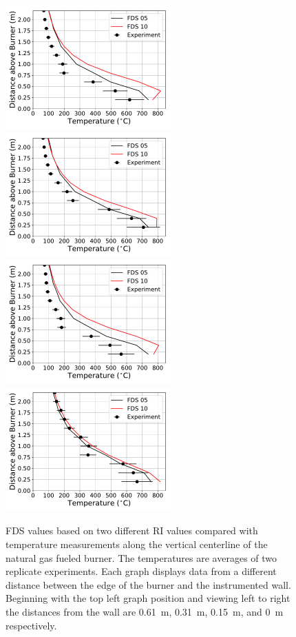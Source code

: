 \documentclass[twoside]{uocthesis}
\begin{document}
{\begin{figure}[ht!]
  \centering
  \includegraphics[width=2.5in]{../Figures/IWGB_NG_TC_Plume_Avg_2D_RF_RI}
  \includegraphics[width=2.5in]{../Figures/IWGB_NG_TC_Plume_Avg_1D_RF_RI}\\
  \includegraphics[width=2.5in]{../Figures/IWGB_NG_TC_Plume_Avg_0p5D_RF_RI}
  \includegraphics[width=2.5in]{../Figures/IWGB_NG_TC_Plume_Avg_0D_RF_RI}\\
  \caption[FDS values based on two different RI values compared with temperature measurements along the vertical centerline of the natural gas fueled burner]{FDS values based on two different RI values compared with temperature measurements along the vertical centerline of the natural gas fueled burner. The temperatures are averages of two replicate experiments. Each graph displays data from a different distance between the edge of the burner and the instrumented wall.  Beginning with the top left graph position and viewing left to right the distances from the wall are 0.61~m, 0.31~m, 0.15~m, and 0~m respectively.}
  \label{FDS_Plume_IWGB_comp}
\end{figure}

}
\end{document}
